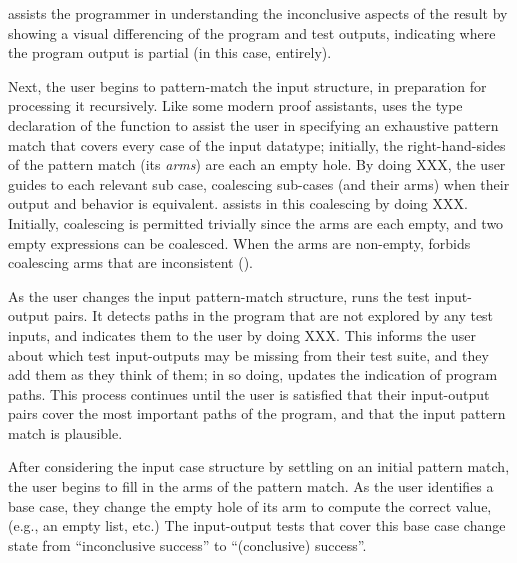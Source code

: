 {\Hazel assists the programmer in understanding the inconclusive
aspects of the result by showing a visual differencing of the program
and test outputs, indicating where the program output is partial (in
this case, entirely).



Next, the user begins to pattern-match the input structure, in
preparation for processing it recursively.
%
Like some modern proof assistants, \Hazel uses the type declaration of
the function to assist the user in specifying an exhaustive pattern
match that covers every case of the input datatype; initially, the
right-hand-sides of the pattern match (its \emph{arms}) are each an
empty hole.
%
By doing XXX, the user guides \Hazel to each relevant sub case,
coalescing sub-cases (and their arms) when their output and behavior
is equivalent.
%
\Hazel assists in this coalescing by doing XXX.
%
Initially, coalescing is permitted trivially since the arms are each
empty, and two empty expressions can be coalesced.
%
When the arms are non-empty, \Hazel forbids coalescing arms that are
inconsistent ().

As the user changes the input pattern-match structure, \Hazel runs the
test input-output pairs.  It detects paths in the program that are not
explored by any test inputs, and indicates them to the user by doing
XXX.
%
This informs the user about which test input-outputs may be missing
from their test suite, and they add them as they think of them; in so
doing, \Hazel updates the indication of program paths.  This process
continues until the user is satisfied that their input-output pairs
cover the most important paths of the program, and that the input
pattern match is plausible.

After considering the input case structure by settling on an initial
pattern match, the user begins to fill in the arms of the pattern
match.
%
As the user identifies a base case, they change the empty hole of its
arm to compute the correct value, (e.g., an empty list, etc.)
%
The input-output tests that cover this base case change state from
``inconclusive success'' to ``(conclusive) success''.

}
